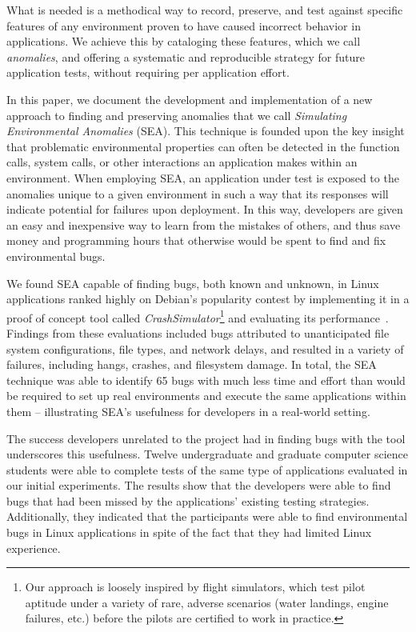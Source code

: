 What is needed is a methodical way to record, preserve, and test against
specific features of any environment proven to have caused incorrect
behavior in applications. We achieve this by cataloging these
features, which we call \textit{anomalies}, and
offering a systematic and reproducible strategy for
future application tests, without
requiring per application effort.

In  this paper, we document the development and implementation of a new
approach to finding and preserving anomalies that we call \textit{Simulating
Environmental Anomalies} (SEA). This technique is founded upon the key
insight that problematic environmental properties can often be detected
in the function calls, system
calls, or other interactions an application makes within an
environment. When employing SEA,
an application under test is exposed
to the anomalies unique to a given environment
in such a way that its responses will indicate
potential for failures upon deployment. In this way, developers are given
an easy and inexpensive way to learn from the mistakes of others, and
thus save money and programming hours that otherwise would be spent to
find and fix environmental bugs.

We found SEA capable of finding bugs,
both known and unknown,
in Linux applications ranked
highly on Debian's popularity contest
by implementing it in a proof of concept tool
called {\em CrashSimulator}\footnote{Our approach is
loosely inspired by flight simulators, which test pilot aptitude under a
variety of rare, adverse scenarios (water landings, engine failures,
etc.) before the pilots are certified to work in practice.}
and evaluating its performance~\cite{DebPopCon}.
Findings from these evaluations included bugs
attributed to
unanticipated file system configurations, file types, and network delays,
and resulted in a variety of failures, including hangs, crashes, and
filesystem damage.  In total, the SEA technique was able to identify 65
bugs with much less
time and effort than would be required to set up real environments and
execute the same applications within them -- illustrating SEA's
usefulness for developers in a real-world setting.

The success developers unrelated to the project had in finding bugs
with the tool underscores this usefulness.
Twelve undergraduate and graduate computer science
students were able to complete tests of the same type of applications
evaluated in our initial experiments. The results show that the
developers were able to find bugs that had been missed by the
applications' existing testing strategies. Additionally,
they indicated that
the participants were able to find environmental bugs in
Linux applications in spite of the
fact that they had limited Linux experience.

